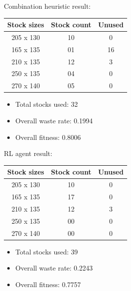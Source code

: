 \documentclass[a4paper]{article}
\begin{document}
    \begin{center}
    \begin{minipage}{0.45\textwidth}
        Combination heuristic result:\\
        
        \centering
        \begin{tabular}{|c|c|c|}
        \hline
        \rowcolor{gray!30} \textbf{Stock sizes} & \textbf{Stock count} & \textbf{Unused} \\ \hline
        205 x 130 & 10 & 0 \\ \hline
        165 x 135 & 01 & 16 \\ \hline
        210 x 135 & 12 & 3 \\ \hline
        250 x 135 & 04 & 0 \\ \hline
        270 x 140 & 05 & 0 \\ \hline
        \end{tabular}
        \centering
        \begin{itemize}
            \item Total stocks used: 32 
            \item Overall waste rate: 0.1994 
            \item Overall fitness: 0.8006
        \end{itemize}
    \end{minipage}
    \hfill
    \begin{minipage}{0.45\textwidth}
        RL agent result:\\
        
        \centering
        \begin{tabular}{|c|c|c|}
        \hline
        \rowcolor{gray!30} \textbf{Stock sizes} & \textbf{Stock count} & \textbf{Unused} \\ \hline
        205 x 130 & 10 & 0 \\ \hline
        165 x 135 & 17 & 0 \\ \hline
        210 x 135 & 12 & 3 \\ \hline
        250 x 135 & 00 & 0 \\ \hline
        270 x 140 & 00 & 0 \\ \hline
        \end{tabular}
        \centering
        \begin{itemize}
            \item Total stocks used: 39 
            \item Overall waste rate: 0.2243
            \item Overall fitness: 0.7757
        \end{itemize}
    \end{minipage}
    \end{center}
    \pagebreak
\end{document}
